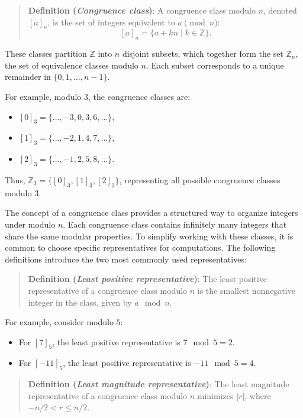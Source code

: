 \documentclass[
  letterpaper,
  DIV=11,
  numbers=noendperiod,
  oneside]{scrartcl}
\providecommand{\tightlist}{%
  \setlength{\itemsep}{0pt}\setlength{\parskip}{0pt}}\usepackage{longtable,booktabs,array}
\begin{document}
\begin{quote}
\textbf{Definition (\emph{Congruence class})}: A congruence class modulo
\(n\), denoted \([a]_n\), is the set of integers equivalent to
\(a \pmod{n}\): \[
[a]_n = \{a + kn \mid k \in \mathbb{Z}\}.
\]
\end{quote}

These classes partition \(\mathbb{Z}\) into \(n\) disjoint subsets,
which together form the set \(\mathbb{Z}_n\), the set of equivalence
classes modulo \(n\). Each subset corresponds to a unique remainder in
\(\{0, 1, \dots, n-1\}\).

For example, modulo \(3\), the congruence classes are:

\begin{itemize}
\tightlist
\item
  \([0]_3 = \{..., -3, 0, 3, 6, ...\}\),
\item
  \([1]_3 = \{..., -2, 1, 4, 7, ...\}\),
\item
  \([2]_3 = \{..., -1, 2, 5, 8, ...\}\).
\end{itemize}

Thus, \(\mathbb{Z}_3 = \{[0]_3, [1]_3, [2]_3\}\), representing all
possible congruence classes modulo \(3\).

The concept of a congruence class provides a structured way to organize
integers under modulo \(n\). Each congruence class contains infinitely
many integers that share the same modular properties. To simplify
working with these classes, it is common to choose specific
representatives for computations. The following definitions introduce
the two most commonly used representatives:

\begin{quote}
\textbf{Definition (\emph{Least positive representative})}: The least
positive representative of a congruence class modulo \(n\) is the
smallest nonnegative integer in the class, given by \(a \mod n\).
\end{quote}

For example, consider modulo \(5\):

\begin{itemize}
\tightlist
\item
  For \([7]_5\), the least positive representative is \(7 \mod 5 = 2\).
\item
  For \([-11]_5\), the least positive representative is
  \(-11 \mod 5 = 4\).
\end{itemize}

\begin{quote}
\textbf{Definition (\emph{Least magnitude representative})}: The least
magnitude representative of a congruence class modulo \(n\) minimizes
\(|r|\), where \(-n/2 < r \leq n/2\).
\end{quote}
\end{document}

